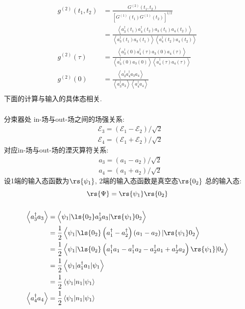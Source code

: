    \begin{frame} 
    \frametitle{}
    \[\begin{aligned}
     g^{(2)} (t_1, t_2) &= \frac{G^{(2)}(t_1,t_2) }{[G^{(1)}(t_1) G^{(1)}(t_2)]^{1 /2} }\\ 
     &=  \frac{\left\langle a_3 ^{\dagger}(t_1)a_4^{\dagger}(t_2)a_3(t_1)a_4(t_2)  \right\rangle}{ \left\langle a_3^{\dagger}(t_1)a_3(t_1) \right\rangle  \left\langle a_4^{\dagger}(t_2)a_4(t_2) \right\rangle}  \\ 
     g^{(2)} (\tau) &= \frac{\left\langle a_3^{\dagger}(0)a_4^{\dagger}(\tau)a_3(0)a_4(\tau)  \right\rangle}{ \left\langle a_3^{\dagger}(0)a_3(0) \right\rangle  \left\langle a_4^{\dagger}(\tau)a_4(\tau) \right\rangle} \\ 
     g^{(2)} (0) &= \frac{\left\langle a_3^{\dagger}a_4^{\dagger}a_3a_4  \right\rangle}{ \left\langle a_3^{\dagger}a_3 \right\rangle  \left\langle a_4^{\dagger}a_4 \right\rangle} \\ 
    \end{aligned} \]
    下面的计算与输入的具体态相关. 
\end{frame}

\begin{frame} 
 \frametitle{}
 分束器处 in-场与out-场之间的场强关系:
 \[\begin{aligned}
    &\mathcal{E}_{3}=\left(\mathcal{E}_{1}-\mathcal{E}_{2}\right) / \sqrt{2} \\
    &\mathcal{E}_{4}=\left(\mathcal{E}_{1}+\mathcal{E}_{2}\right) / \sqrt{2}
    \end{aligned}\]
对应in-场与out-场的湮灭算符关系:
\[\begin{aligned}
    &a_{3}=\left(a_{1}-a_{2}\right) / \sqrt{2} \\
    &a_{4}=\left(a_{1}+a_{2}\right) / \sqrt{2}
    \end{aligned}\]
设1端的输入态函数为$\rs{\psi_1}$, 2端的输入态函数是真空态$\rs{0_2}$
总的输入态:
\[\rs{\Psi}= \rs{\psi_1}\rs{0_2} \]
\end{frame}

\begin{frame} 
 \frametitle{}
    \[\begin{aligned}
        \left\langle a_3^{\dagger}a_3 \right\rangle &=  \left\langle \psi_1|\ls{0_2}  a_3^{\dagger}a_3 |\rs{\psi_1}0_2\right\rangle \\ 
        &=\frac{1}{2}\left\langle \psi_1|\ls{0_2} \left(a^{\dagger}_{1}-a^{\dagger} _{2}\right)\left(a_{1}-a_{2}\right) |\rs{\psi_1}0_2\right\rangle  \\ 
        &=\frac{1}{2}\left\langle \psi_1|\ls{0_2} \left(a^{\dagger}_{1}a_{1} - a^{\dagger}_{1}a_{2} - a^{\dagger}_{2}a_{1} + a^{\dagger}_{2}a_{2} \right) \rs{\psi_1}|0_2\right\rangle  \\
        &= \frac{1}{2}\left\langle \psi_1| a^{\dagger}_{1}a_{1}  |\psi_1\right\rangle \\ 
        &= \frac{1}{2}\left\langle \psi_1| n_1 |\psi_1\right\rangle \\ 
    \left\langle a_4^{\dagger}a_4 \right\rangle &= \frac{1}{2}\left\langle \psi_1| n_1 |\psi_1\right\rangle       
    \end{aligned} \]
\end{frame}

